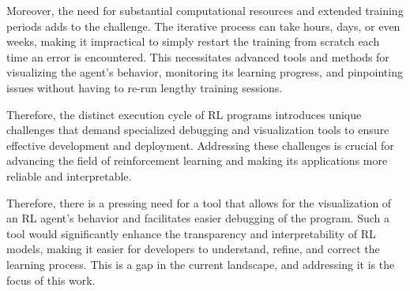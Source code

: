 Moreover, the need for substantial computational resources and extended training 
periods adds to the challenge. The iterative process can take hours, days, or 
even weeks, making it impractical to simply restart the training from scratch 
each time an error is encountered. This necessitates advanced tools and methods 
for visualizing the agent's behavior, monitoring its learning progress, and 
pinpointing issues without having to re-run lengthy training sessions.

Therefore, the distinct execution cycle of \ac{RL} programs introduces unique 
challenges that demand specialized debugging and visualization tools to ensure 
effective development and deployment. Addressing these challenges is crucial 
for advancing the field of reinforcement learning and making its applications 
more reliable and interpretable.

Therefore, there is a pressing need for a tool that allows for the visualization 
of an \ac{RL} agent's behavior and facilitates easier debugging of the program. 
Such a tool would significantly enhance the transparency and interpretability 
of \ac{RL} models, making it easier for developers to understand, refine, and correct 
the learning process. This is a gap in the current landscape, and addressing it 
is the focus of this work.

\endinput

